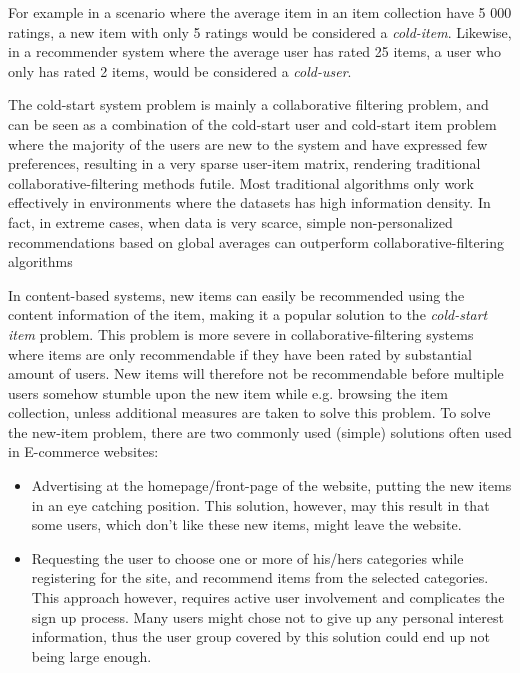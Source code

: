 For example in a scenario where the average item in an item collection have 5 000 ratings, a new item with only 5 ratings would be considered a \emph{cold-item}. Likewise, in a recommender system where the average user has rated 25 items, a user who only has rated 2 items, would be considered a \emph{cold-user}.

The cold-start system problem is mainly a collaborative filtering problem, and
can be seen as a combination of the cold-start user and cold-start item problem
where the majority of the users are new to the system and have expressed few
preferences, resulting in a very sparse user-item matrix, rendering traditional collaborative-filtering methods futile. Most traditional algorithms only work effectively in environments where the datasets has high information density. In fact, in extreme cases, when data
is very scarce, simple non-personalized recommendations based on global
averages can outperform collaborative-filtering algorithms \cite{Park2006}

In content-based systems, new items can easily be
recommended using the content information of the item, making it a popular
solution to the \emph{cold-start item} problem. This problem is more
severe in collaborative-filtering systems where items are only recommendable if
they have been rated by substantial amount of users. New items will therefore not be
recommendable before multiple users somehow stumble upon the new item while
e.g. browsing the item collection, unless additional measures are taken to
solve this problem. To solve the new-item problem, there are two commonly used (simple) solutions often used in E-commerce websites:

\begin{itemize}
\item Advertising at the homepage/front-page of the website, putting the new
items in an eye catching position. This solution, however, may this result in
that some users, which don't like these new items, might leave the website.
\item Requesting the user to choose one or more of his/hers categories while
registering for the site, and recommend items from the selected categories.
This approach however, requires active user involvement and complicates the
sign up process. Many users might chose not to give up any
personal interest information, thus the user group covered by this solution could end up not being large enough.
\end{itemize}


